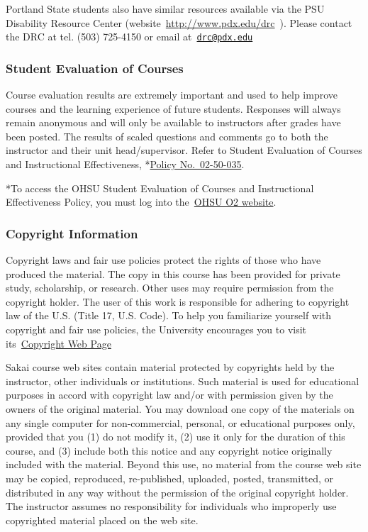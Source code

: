 \documentclass[
  letterpaper,
  DIV=11,
  numbers=noendperiod]{scrartcl}
\begin{document}
Portland State students also have similar resources available via the
PSU Disability Resource Center (website~\url{http://www.pdx.edu/drc}~).
Please contact the DRC at tel. (503) 725-4150 or email
at~\href{mailto:drc@pdx.edu}{\nolinkurl{drc@pdx.edu}}

\hypertarget{student-evaluation-of-courses}{%
\subsubsection{Student Evaluation of
Courses}\label{student-evaluation-of-courses}}

Course evaluation results are extremely important and used to help
improve courses and the learning experience of future students.
Responses will always remain anonymous and will only be available to
instructors after grades have been posted. The results of scaled
questions and comments go to both the instructor and their unit
head/supervisor. Refer to Student Evaluation of Courses and
Instructional Effectiveness,
*\href{https://o2.ohsu.edu/policies-and-compliance/ohsu-policy-manual/chapter-2-student-affairs/ohsu-policy-02-50-035.cfm}{Policy
No.~02-50-035}.

*To access the OHSU Student Evaluation of Courses and Instructional
Effectiveness Policy, you must log into
the~\href{https://o2.ohsu.edu/}{OHSU O2 website}.

\hypertarget{copyright-information}{%
\subsubsection{Copyright Information}\label{copyright-information}}

Copyright laws and fair use policies protect the rights of those who
have produced the material. The copy in this course has been provided
for private study, scholarship, or research. Other uses may require
permission from the copyright holder. The user of this work is
responsible for adhering to copyright law of the U.S. (Title 17, U.S.
Code). To help you familiarize yourself with copyright and fair use
policies, the University encourages you to visit
its~\href{https://www.ohsu.edu/xd/education/library/services/copyright/}{Copyright
Web Page}

Sakai course web sites contain material protected by copyrights held by
the instructor, other individuals or institutions. Such material is used
for educational purposes in accord with copyright law and/or with
permission given by the owners of the original material. You may
download one copy of the materials on any single computer for
non-commercial, personal, or educational purposes only, provided that
you (1) do not modify it, (2) use it only for the duration of this
course, and (3) include both this notice and any copyright notice
originally included with the material. Beyond this use, no material from
the course web site may be copied, reproduced, re-published, uploaded,
posted, transmitted, or distributed in any way without the permission of
the original copyright holder. The instructor assumes no responsibility
for individuals who improperly use copyrighted material placed on the
web site.
\end{document}
